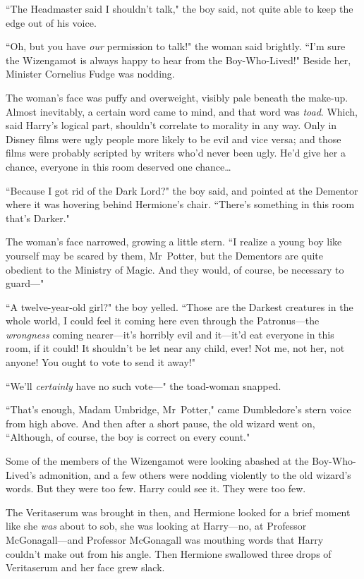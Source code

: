 ``The Headmaster said I shouldn't talk," the boy said, not quite able to keep the edge out of his voice.

``Oh, but you have \emph{our} permission to talk!" the woman said brightly. ``I'm sure the Wizengamot is always happy to hear from the Boy-Who-Lived!" Beside her, Minister Cornelius Fudge was nodding.

The woman's face was puffy and overweight, visibly pale beneath the make-up. Almost inevitably, a certain word came to mind, and that word was \emph{toad}. Which, said Harry's logical part, shouldn't correlate to morality in any way. Only in Disney films were ugly people more likely to be evil and vice versa; and those films were probably scripted by writers who'd never been ugly. He'd give her a chance, everyone in this room deserved one chance{\ldots}

``Because I got rid of the Dark Lord?" the boy said, and pointed at the Dementor where it was hovering behind Hermione's chair. ``There's something in this room that's Darker."

The woman's face narrowed, growing a little stern. ``I realize a young boy like yourself may be scared by them, Mr~Potter, but the Dementors are quite obedient to the Ministry of Magic. And they would, of course, be necessary to guard—"

``A twelve-year-old girl?" the boy yelled. ``Those are the Darkest creatures in the whole world, I could feel it coming here even through the Patronus—the \emph{wrongness} coming nearer—it's horribly evil and it—it'd eat everyone in this room, if it could! It shouldn't be let near any child, ever! Not me, not her, not anyone! You ought to vote to send it away!"

``We'll \emph{certainly} have no such vote—" the toad-woman snapped.

``That's enough, Madam Umbridge, Mr~Potter," came Dumbledore's stern voice from high above. And then after a short pause, the old wizard went on, ``Although, of course, the boy is correct on every count."

Some of the members of the Wizengamot were looking abashed at the Boy-Who-Lived's admonition, and a few others were nodding violently to the old wizard's words. But they were too few. Harry could see it. They were too few.

The Veritaserum was brought in then, and Hermione looked for a brief moment like she \emph{was} about to sob, she was looking at Harry—no, at Professor McGonagall—and Professor McGonagall was mouthing words that Harry couldn't make out from his angle. Then Hermione swallowed three drops of Veritaserum and her face grew slack.

